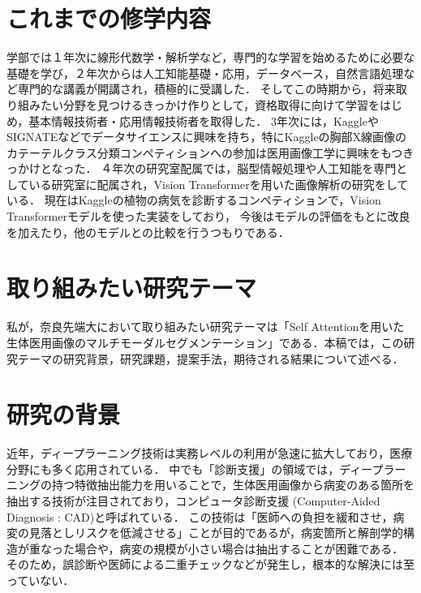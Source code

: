 \documentclass[a4j,10pt,twocolumn]{jarticle}
\begin{document}
\section{これまでの修学内容}
学部では１年次に線形代数学・解析学など，専門的な学習を始めるために必要な基礎を学び，２年次からは人工知能基礎・応用，データベース，自然言語処理など専門的な講義が開講され，積極的に受講した．
そしてこの時期から，将来取り組みたい分野を見つけるきっかけ作りとして，資格取得に向けて学習をはじめ，基本情報技術者・応用情報技術者を取得した．
3年次には，KaggleやSIGNATEなどでデータサイエンスに興味を持ち，特にKaggleの胸部X線画像のカテーテルクラス分類コンペティションへの参加は医用画像工学に興味をもつきっかけとなった．
４年次の研究室配属では，脳型情報処理や人工知能を専門としている研究室に配属され，Vision Transformerを用いた画像解析の研究をしている．
現在はKaggleの植物の病気を診断するコンペティションで，Vision Transformerモデルを使った実装をしており，
今後はモデルの評価をもとに改良を加えたり，他のモデルとの比較を行うつもりである．

\section{取り組みたい研究テーマ}
私が，奈良先端大において取り組みたい研究テーマは「Self Attentionを用いた生体医用画像のマルチモーダルセグメンテーション」である．本稿では，この研究テーマの研究背景，研究課題，提案手法，期待される結果について述べる．

\section{研究の背景}
近年，ディープラーニング技術は実務レベルの利用が急速に拡大しており，医療分野にも多く応用されている．
中でも「診断支援」の領域では，ディープラーニングの持つ特徴抽出能力を用いることで，生体医用画像から病変のある箇所を抽出する技術が注目されており，コンピュータ診断支援 (Computer-Aided Diagnosis : CAD)と呼ばれている． 
この技術は「医師への負担を緩和させ，病変の見落としリスクを低減させる」ことが目的であるが，病変箇所と解剖学的構造が重なった場合や，病変の規模が小さい場合は抽出することが困難である．
そのため，誤診断や医師による二重チェックなどが発生し，根本的な解決には至っていない．
\end{document}
